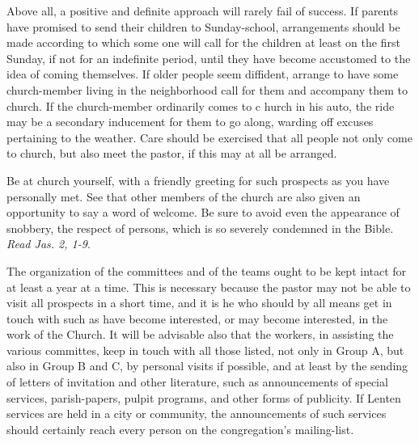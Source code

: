 \documentclass[
]{book}
\begin{document}
Above all, a positive and definite approach will rarely fail of success. If parents have promised to send their children to Sunday-school, arrangements should be made according to which some one will call for the children at least on the first Sunday, if not for an indefinite period, until they have become accustomed to the idea of coming themselves. If older people seem diffident, arrange to have some church-member living in the neighborhood call for them and accompany them to church. If the church-member ordinarily comes to c hurch in his auto, the ride may be a secondary inducement for them to go along, warding off excuses pertaining to the weather. Care should be exercised that all people not only come to church, but also meet the pastor, if this may at all be arranged.

Be at church yourself, with a friendly greeting for such prospects as you have personally met. See that other members of the church are also given an opportunity to say a word of welcome. Be sure to avoid even the appearance of snobbery, the respect of persons, which is so severely condemned in the Bible. \emph{Read Jas. 2, 1-9}.

The organization of the committees and of the teams ought to be kept intact for at least a year at a time. This is necessary because the pastor may not be able to visit all prospects in a short time, and it is he who should by all means get in touch with such as have become interested, or may become interested, in the work of the Church. It will be advisable also that the workers, in assisting the various committes, keep in touch with all those listed, not only in Group A, but also in Group B and C, by personal visits if possible, and at least by the sending of letters of invitation and other literature, such as announcements of special services, parish-papers, pulpit programs, and other forms of publicity. If Lenten services are held in a city or community, the announcements of such services should certainly reach every person on the congregation's mailing-list.
\end{document}
